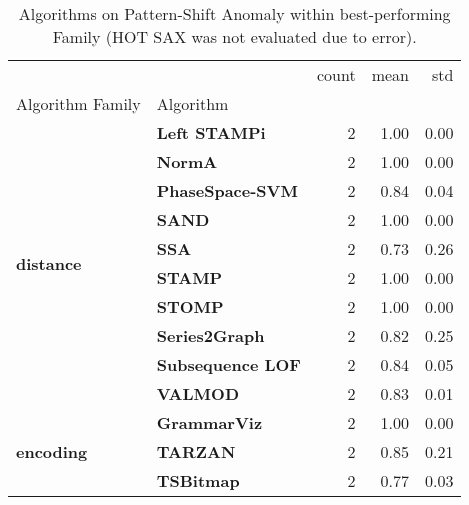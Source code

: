 \begin{table}[h]
\centering
\caption{Algorithms on Pattern-Shift Anomaly within best-performing Family (HOT SAX was not evaluated due to error).}
\label{tab:bp-pattern-shift}
\begin{tabular}{llrrr}
\toprule
 &  & count & mean & std \\
Algorithm Family & Algorithm &  &  &  \\
\midrule
\multirow[t]{10}{*}{\textbf{distance}} & \textbf{Left STAMPi} & 2 & 1.00 & 0.00 \\
\textbf{} & \textbf{NormA} & 2 & 1.00 & 0.00 \\
\textbf{} & \textbf{PhaseSpace-SVM} & 2 & 0.84 & 0.04 \\
\textbf{} & \textbf{SAND} & 2 & 1.00 & 0.00 \\
\textbf{} & \textbf{SSA} & 2 & 0.73 & 0.26 \\
\textbf{} & \textbf{STAMP} & 2 & 1.00 & 0.00 \\
\textbf{} & \textbf{STOMP} & 2 & 1.00 & 0.00 \\
\textbf{} & \textbf{Series2Graph} & 2 & 0.82 & 0.25 \\
\textbf{} & \textbf{Subsequence LOF} & 2 & 0.84 & 0.05 \\
\textbf{} & \textbf{VALMOD} & 2 & 0.83 & 0.01 \\
\cline{1-5}
\multirow[t]{3}{*}{\textbf{encoding}} & \textbf{GrammarViz} & 2 & 1.00 & 0.00 \\
\textbf{} & \textbf{TARZAN} & 2 & 0.85 & 0.21 \\
\textbf{} & \textbf{TSBitmap} & 2 & 0.77 & 0.03 \\
\cline{1-5}
\bottomrule
\end{tabular}
\end{table}
